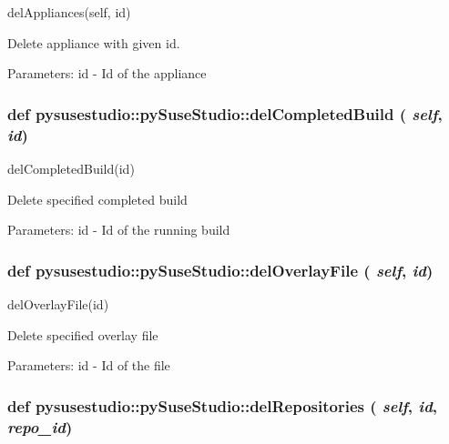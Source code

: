 \begin{DoxyVerb}delAppliances(self, id)

        Delete appliance with given id. 
            
            Parameters:
id - Id of the appliance

\end{DoxyVerb}
 \hypertarget{classpysusestudio_1_1py_suse_studio_af4e1c32a537d923d174dd3dce2af889b}{
\subsubsection[{delCompletedBuild}]{\setlength{\rightskip}{0pt plus 5cm}def pysusestudio::pySuseStudio::delCompletedBuild ( {\em self}, \/   {\em id})}}
\label{classpysusestudio_1_1py_suse_studio_af4e1c32a537d923d174dd3dce2af889b}
\begin{DoxyVerb}delCompletedBuild(id)

            Delete specified completed build
            
            Parameters:
id - Id of the running build

\end{DoxyVerb}
 \hypertarget{classpysusestudio_1_1py_suse_studio_a4709eddea40e484a40f499e07c67f698}{
\subsubsection[{delOverlayFile}]{\setlength{\rightskip}{0pt plus 5cm}def pysusestudio::pySuseStudio::delOverlayFile ( {\em self}, \/   {\em id})}}
\label{classpysusestudio_1_1py_suse_studio_a4709eddea40e484a40f499e07c67f698}
\begin{DoxyVerb}delOverlayFile(id)

            Delete specified overlay file
            
            Parameters:
id - Id of the file

\end{DoxyVerb}
 \hypertarget{classpysusestudio_1_1py_suse_studio_a25daf579acd05aa6b674fa2e7c61e2f8}{
\subsubsection[{delRepositories}]{\setlength{\rightskip}{0pt plus 5cm}def pysusestudio::pySuseStudio::delRepositories ( {\em self}, \/   {\em id}, \/   {\em repo\_\-id})}}
